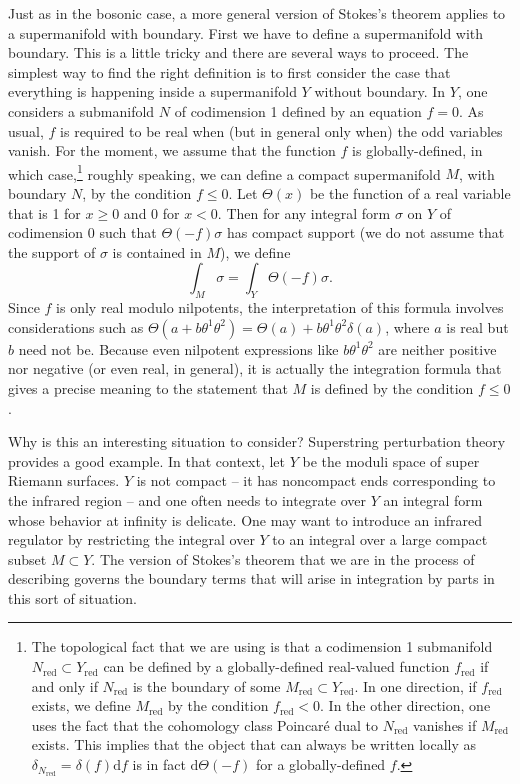 \documentclass[11pt,a4paper]{article}
\def\red{{\mathrm{red}}}
\def\d{{\mathrm d}}
\begin{document}
Just as in the bosonic case, a more general version of Stokes's theorem applies to a supermanifold with boundary.  First we have to define a supermanifold with boundary.
This is a little tricky and there are several ways to proceed. The simplest way to find the right definition is to first consider the
case  that everything is happening inside a supermanifold $Y$ without boundary.
  In $Y$, one considers a submanifold $N$ of codimension 1 defined by an equation $f=0$.  As usual, $f$ is required to be real when (but in general only when) the odd
  variables vanish.
For the moment, we assume that the function
$f$ is globally-defined, in which case,\footnote{The topological fact that we are using is that a codimension 1 submanifold $N_\red\subset Y_\red$ can be defined
by a globally-defined real-valued function $f_\red$ if and only if $N_\red$ is the boundary of some $M_\red\subset Y_\red$.  In one direction,  if $f_\red$ exists,
we define $M_\red$ by the condition $f_\red<0$.  In the other direction, one uses the fact that the cohomology class Poincar\'e dual to $N_\red$ vanishes if $M_\red$ exists. This
implies that the object that can always be written locally as $\delta_{N_\red}=\delta(f)\d f$ is in fact $\d\Theta(-f)$ for a globally-defined $f$.}  
roughly speaking,
we can define a compact supermanifold $M$, with boundary $N$, by the condition $f\leq 0$.  Let $\Theta(x)$ be the function of a real
variable that is 1 for $x\geq 0$ and 0 for $x<0$.  Then for any  integral form $\sigma$ on $Y$ of codimension 0 such that $\Theta(-f)\sigma$ has compact support
(we do not assume that the support
of $\sigma$ is contained in $M$), we define
\begin{equation}\label{yrt}\int_M\sigma =\int_Y\Theta(-f)\sigma.\end{equation}
Since $f$ is only real modulo nilpotents, the interpretation of this formula involves considerations such as 
$\Theta(a+b\theta^1\theta^2)=\Theta(a)+b\theta^1\theta^2\delta(a)$, where $a$ is real but $b$ need not be.  Because even nilpotent expressions like $b\theta^1\theta^2$
are neither positive nor negative (or even real, in general), it is actually the integration
formula that gives a precise meaning to the statement that $M$ is defined by the condition 
$f\leq 0$.

Why is this an interesting situation to consider?
Superstring perturbation theory provides a good example.  In that context, let $Y$
be the moduli space of super Riemann surfaces.  $Y$ is not compact -- it has noncompact ends corresponding to the infrared region --  
and one often needs to integrate over $Y$ an integral form whose behavior at infinity is delicate.
One may want to introduce an infrared regulator by restricting the integral over $Y$ to an integral over a large compact subset $M\subset Y$.
The version of Stokes's theorem that we are in the process of describing governs the boundary terms that will arise in integration by parts in this sort of situation.
\end{document}
